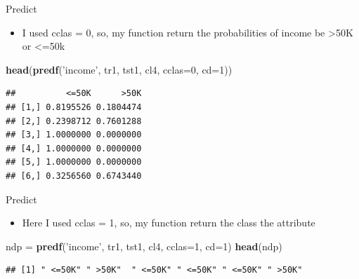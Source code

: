 \documentclass[
  10pt,
  ignorenonframetext,
]{beamer}
\newenvironment{Shaded}{\begin{snugshade}}{\end{snugshade}}
\newcommand{\DataTypeTok}[1]{\textcolor[rgb]{0.13,0.29,0.53}{#1}}
\newcommand{\DecValTok}[1]{\textcolor[rgb]{0.00,0.00,0.81}{#1}}
\newcommand{\KeywordTok}[1]{\textcolor[rgb]{0.13,0.29,0.53}{\textbf{#1}}}
\newcommand{\NormalTok}[1]{#1}
\newcommand{\StringTok}[1]{\textcolor[rgb]{0.31,0.60,0.02}{#1}}
\providecommand{\tightlist}{%
  \setlength{\itemsep}{0pt}\setlength{\parskip}{0pt}}
\begin{document}
\begin{frame}[fragile]{Predict}
\protect\hypertarget{predict-6}{}

\begin{itemize}
\tightlist
\item
  I used cclas = 0, so, my function return the probabilities of income
  be \textgreater50K or \textless=50k
\end{itemize}

\begin{Shaded}
\begin{Highlighting}[]
\KeywordTok{head}\NormalTok{(}\KeywordTok{predf}\NormalTok{(}\StringTok{'income'}\NormalTok{, tr1, tst1, cl4, }\DataTypeTok{cclas=}\DecValTok{0}\NormalTok{, }\DataTypeTok{cd=}\DecValTok{1}\NormalTok{))}
\end{Highlighting}
\end{Shaded}

\begin{verbatim}
##          <=50K      >50K
## [1,] 0.8195526 0.1804474
## [2,] 0.2398712 0.7601288
## [3,] 1.0000000 0.0000000
## [4,] 1.0000000 0.0000000
## [5,] 1.0000000 0.0000000
## [6,] 0.3256560 0.6743440
\end{verbatim}

\end{frame}

\begin{frame}[fragile]{Predict}
\protect\hypertarget{predict-7}{}

\begin{itemize}
\tightlist
\item
  Here I used cclas = 1, so, my function return the class the attribute
\end{itemize}

\begin{Shaded}
\begin{Highlighting}[]
\NormalTok{ndp =}\StringTok{ }\KeywordTok{predf}\NormalTok{(}\StringTok{'income'}\NormalTok{, tr1, tst1, cl4, }\DataTypeTok{cclas=}\DecValTok{1}\NormalTok{, }\DataTypeTok{cd=}\DecValTok{1}\NormalTok{)}
\KeywordTok{head}\NormalTok{(ndp)}
\end{Highlighting}
\end{Shaded}

\begin{verbatim}
## [1] " <=50K" " >50K"  " <=50K" " <=50K" " <=50K" " >50K"
\end{verbatim}

\end{frame}
\end{document}
